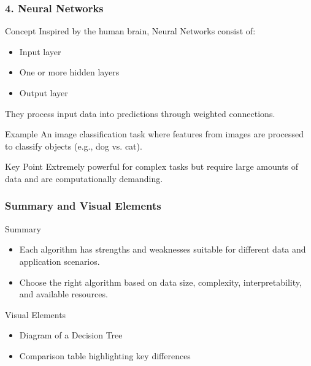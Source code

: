 \documentclass[aspectratio=169]{beamer}
\begin{document}
\begin{frame}[fragile]
    \frametitle{4. Neural Networks}
    \begin{block}{Concept}
        Inspired by the human brain, Neural Networks consist of:
        \begin{itemize}
            \item Input layer
            \item One or more hidden layers
            \item Output layer
        \end{itemize}
        They process input data into predictions through weighted connections.
    \end{block}

    \begin{block}{Example}
        An image classification task where features from images are processed to classify objects (e.g., dog vs. cat).
    \end{block}

    \begin{block}{Key Point}
        Extremely powerful for complex tasks but require large amounts of data and are computationally demanding.
    \end{block}
\end{frame}

\begin{frame}[fragile]
    \frametitle{Summary and Visual Elements}
    \begin{block}{Summary}
        \begin{itemize}
            \item Each algorithm has strengths and weaknesses suitable for different data and application scenarios.
            \item Choose the right algorithm based on data size, complexity, interpretability, and available resources.
        \end{itemize}
    \end{block}

    \begin{block}{Visual Elements}
        \begin{itemize}
            \item Diagram of a Decision Tree
            \item Comparison table highlighting key differences
        \end{itemize}
    \end{block}
\end{frame}
\end{document}
